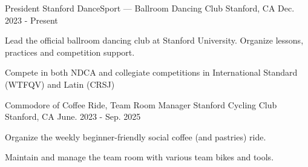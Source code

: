 

\begin{cventries}

\cventry
{President} %
{Stanford DanceSport — Ballroom Dancing Club} %
{Stanford, CA} %
{Dec. 2023 - Present} %
{
  \begin{cvitems} %
  \item{Lead the official ballroom dancing club at Stanford University. Organize lessons, practices and competition support.}
    \item{Compete in both NDCA and collegiate competitions in International Standard (WTFQV) and Latin (CRSJ)}
  \end{cvitems}
}

\cventry
{Commodore of Coffee Ride, Team Room Manager} %
{Stanford Cycling Club} %
{Stanford, CA} %
{June. 2023 - Sep. 2025} %
{
  \begin{cvitems} %
      \item{Organize the weekly beginner-friendly social coffee (and pastries) ride.}
    \item{Maintain and manage the team room with various team bikes and tools.}
  \end{cvitems}
}

 \end{cventries}
